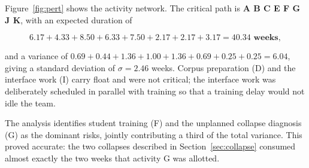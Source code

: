 Figure~\ref{fig:pert} shows the activity network. The critical path is
\textbf{A \arrowto{} B \arrowto{} C \arrowto{} E \arrowto{} F \arrowto{} G
\arrowto{} J \arrowto{} K}, with an expected duration of

\[
6.17 + 4.33 + 8.50 + 6.33 + 7.50 + 2.17 + 2.17 + 3.17 = \mathbf{40.34 \text{ weeks}},
\]

and a variance of $0.69+0.44+1.36+1.00+1.36+0.69+0.25+0.25 = 6.04$, giving a
standard deviation of $\sigma = 2.46$ weeks. Corpus preparation (D) and the
interface work (I) carry float and were not critical; the interface work was
deliberately scheduled in parallel with training so that a training delay would
not idle the team.

The analysis identifies student training (F) and the unplanned collapse
diagnosis (G) as the dominant risks, jointly contributing a third of the total
variance. This proved accurate: the two collapses described in
Section~\ref{sec:collapse} consumed almost exactly the two weeks that activity G
was allotted.

